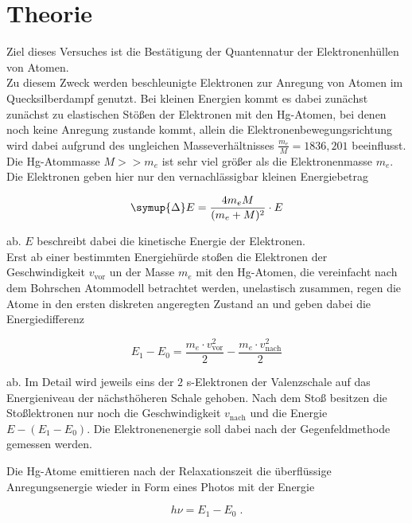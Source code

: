 \section{Theorie}
\label{sec:Theorie}

Ziel dieses Versuches ist die Bestätigung der Quantennatur der Elektronenhüllen von 
Atomen.\\

Zu diesem Zweck werden beschleunigte Elektronen zur Anregung von Atomen 
im Quecksilberdampf genutzt. Bei kleinen Energien kommt es dabei zunächst zunächst zu 
elastischen Stößen der Elektronen mit den Hg-Atomen, bei denen noch keine Anregung
zustande kommt, allein die Elektronenbewegungsrichtung wird dabei aufgrund des ungleichen 
Masseverhältnisses $\frac{m_e}{M} = 1836,201$ beeinflusst. Die Hg-Atommasse $M >> m_e$ ist 
sehr viel größer als die Elektronenmasse $m_e$.
Die Elektronen geben hier nur den vernachlässigbar kleinen Energiebetrag

\begin{equation}
    \symup{\Delta} E = \frac{4 m_e M}{(m_e + M)^2} \cdot E
\end{equation}

ab. $E$ beschreibt dabei die kinetische Energie der Elektronen.\\

Erst ab einer bestimmten Energiehürde stoßen die Elektronen der Geschwindigkeit
$v_\text{vor}$ un der Masse $m_e$ mit den Hg-Atomen, die vereinfacht nach dem Bohrschen Atommodell betrachtet werden,
unelastisch zusammen, regen die Atome in den ersten diskreten angeregten Zustand an und geben dabei
die Energiedifferenz

\begin{equation}
    E_1 - E_0 = \frac{m_e \cdot v_\text{vor}^2}{2} - \frac{m_e \cdot v_\text{nach}^2}{2}
\end{equation}
 
ab. Im Detail wird jeweils eins der $2$ s-Elektronen der Valenzschale auf das Energieniveau der nächsthöheren Schale
gehoben. Nach dem Stoß besitzen die Stoßlektronen nur noch die Geschwindigkeit $v_\text{nach}$ und die Energie
$E - (E_1 - E_0)$.
Die Elektronenenergie soll dabei nach der Gegenfeldmethode gemessen werden.

Die Hg-Atome emittieren nach der Relaxationszeit die überflüssige Anregungsenergie wieder
in Form eines Photos mit der Energie 

\begin{equation}
    h \nu = E_1 - E_0 \; .
\end{equation}

